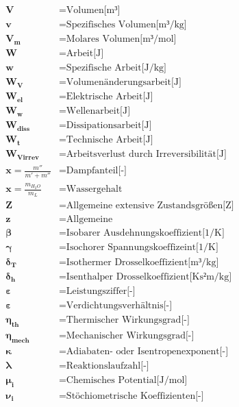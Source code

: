 \documentclass[twocolumn]{article}
\begin{document}
\begin{align*}
	\mathbf{V}		&=	\text{Volumen[m³]} \\
	\mathbf{v}		&=	\text{Spezifisches Volumen[m³/kg]} \\
	\mathbf{V_m}		&=	\text{Molares Volumen[m³/mol]} \\
	\mathbf{W}		&=	\text{Arbeit[J]} \\
	\mathbf{w}		&=	\text{Spezifische Arbeit[J/kg]} \\
	\mathbf{W_V}		&=	\text{Volumenänderungsarbeit[J]} \\
	\mathbf{W_{el}}		&=	\text{Elektrische Arbeit[J]} \\
	\mathbf{W_w}		&=	\text{Wellenarbeit[J]} \\
	\mathbf{W_{diss}}	&=	\text{Dissipationsarbeit[J]} \\
	\mathbf{W_t}		&=	\text{Technische Arbeit[J]} \\
	\mathbf{W_{Virrev}}	&=	\text{Arbeitsverlust durch Irreversibilität[J]} \\
	\mathbf{x}=\frac{m''}{m'+m''}		&=	\text{Dampfanteil[-]} \\
	\mathbf{x}=\frac{m_{H_2O}}{m_L}		&=	\text{Wassergehalt} \\
	\mathbf{Z}		&=	\text{Allgemeine extensive Zustandsgrößen[Z]} \\
	\mathbf{z}		&=	\text{Allgemeine } \\
	\mathbf{\beta}		&=	\text{Isobarer Ausdehnungskoeffizient[1/K]} \\
	\mathbf{\gamma}		&=	\text{Isochorer Spannungskoeffizeint[1/K]} \\
	\mathbf{\delta_T}	&=	\text{Isothermer Drosselkoeffizient[m³/kg]} \\
	\mathbf{\delta_h}	&=	\text{Isenthalper Drosselkoeffizient[Ks²m/kg]} \\
	\mathbf{\varepsilon}	&=	\text{Leistungsziffer[-]} \\
	\mathbf{\varepsilon}	&=	\text{Verdichtungsverhältnis[-]} \\
	\mathbf{\eta_{th}}	&=	\text{Thermischer Wirkungsgrad[-]} \\
	\mathbf{\eta_{mech}}	&=	\text{Mechanischer Wirkungsgrad[-]} \\
	\mathbf{\kappa}		&=	\text{Adiabaten- oder Isentropenexponent[-]} \\
	\mathbf{\lambda}	&=	\text{Reaktionslaufzahl[-]} \\
	\mathbf{\mu_i}		&=	\text{Chemisches Potential[J/mol]} \\
	\mathbf{\nu_i}		&=	\text{Stöchiometrische Koeffizienten[-]} \\

\end{align*}
\end{document}

